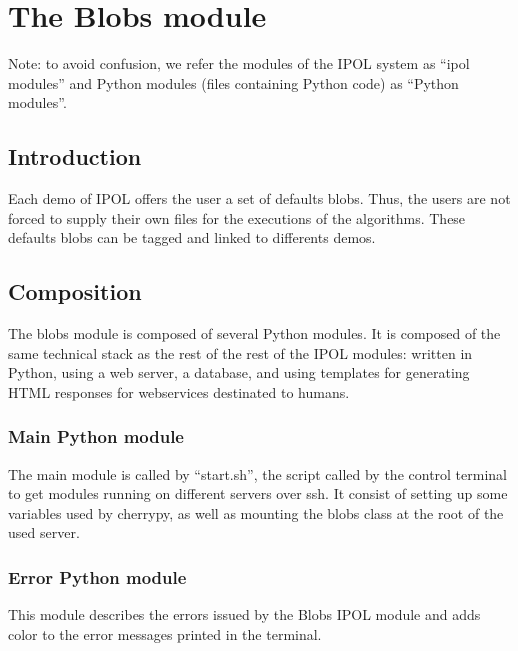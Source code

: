 \section{The Blobs module}

Note: to avoid confusion, we refer the modules of the IPOL system as ``ipol modules'' and Python modules (files containing Python code) as ``Python modules''.

\subsection{Introduction}
Each demo of IPOL offers the user a set of defaults blobs. Thus, the users are not forced to supply their own files for the executions of the algorithms. These defaults blobs can be tagged and linked to differents demos.

\subsection{Composition}
The blobs module is composed of several Python modules. It is composed of the same technical stack as the rest of the rest of the IPOL modules: written in Python, using a web server, a database, and using templates for generating HTML responses for webservices destinated to humans.

\subsubsection{Main Python module}
The main module is called by ``start.sh'', the script called by the control terminal to get modules running on different servers over ssh. It consist of setting up some variables used by cherrypy, as well as mounting the blobs class at the root of the used server.

\subsubsection{Error Python module}
This module describes the errors issued by the Blobs IPOL module and adds color to the error messages printed in the terminal.

